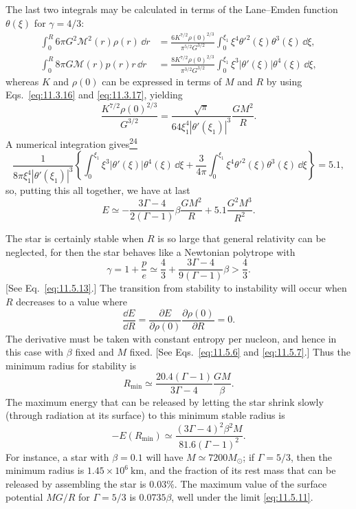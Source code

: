 The last two integrals may be calculated in terms of the Lane--Emden function
\(\theta(\xi)\) for \(\gamma=4/3\):
\[
  \begin{aligned}
  \int_0^R6\pi G^2\mathcal{M}^2(r)\rho(r)\,\dd r
  &=
  \frac{6K^{7/2}\rho(0)^{2/3}}{\pi^{5/2}G^{3/2}}
  \int_0^{\xi_1}\xi^4\theta'^2(\xi)\theta^3(\xi)\,\dd\xi,\\
  \int_0^R8\pi G\mathcal{M}(r)p(r)r\,\dd r
  &=
  \frac{8K^{7/2}\rho(0)^{2/3}}{\pi^{3/2}G^{3/2}}
  \int_0^{\xi_1}\xi^3|\theta'(\xi)|\theta^4(\xi)\,\dd\xi,
  \end{aligned}
\]
whereas \(K\) and \(\rho(0)\) can be expressed in terms of \(M\) and \(R\)
by using Eqs.~\eqref{eq:11.3.16} and \eqref{eq:11.3.17}, yielding
\[
  \frac{K^{7/2}\rho(0)^{2/3}}{G^{3/2}}
  =
  \frac{\sqrt\pi}{64\xi_1^4|\theta'(\xi_1)|^3}
  \frac{GM^2}{R}.
\]
A numerical integration
gives\hyperref[ch11-ref-24]{\textsuperscript{24}}
\[
  \frac1{8\pi\xi_1^4|\theta'(\xi_1)|^3}
  \left\{
    \int_0^{\xi_1}\xi^3|\theta'(\xi)|\theta^4(\xi)\,\dd\xi
    +\frac3{4\pi}
    \int_0^{\xi_1}\xi^4\theta'^2(\xi)\theta^3(\xi)\,\dd\xi
  \right\}
  =
  5.1,
\]
so, putting this all together, we have at last
\begin{equation}
  E
  \simeq
  -\frac{3\Gamma-4}{2(\Gamma-1)}
  \beta\frac{GM^2}{R}
  +5.1\frac{G^2M^3}{R^2}.
  \tag{11.5.16}\label{eq:11.5.16}
\end{equation}

The star is certainly stable when \(R\) is so large that general relativity
can be neglected, for then the star behaves like a Newtonian polytrope with
\[
  \gamma
  =
  1+\frac pe
  \simeq
  \frac43+\frac{3\Gamma-4}{9(\Gamma-1)}\beta
  >
  \frac43.
\]
[See Eq.~\eqref{eq:11.5.13}.] The transition from stability to instability
will occur when \(R\) decreases to a value where
\[
  \frac{\dd E}{\dd R}
  =
  \frac{\partial E}{\partial\rho(0)}
  \frac{\partial\rho(0)}{\partial R}
  =
  0.
\]
The derivative must be taken with constant entropy per nucleon, and hence in
this case with \(\beta\) fixed and \(M\) fixed. [See
Eqs.~\eqref{eq:11.5.6} and \eqref{eq:11.5.7}.] Thus the minimum radius for
stability is
\begin{equation}
  R_{\min}
  \simeq
  \frac{20.4(\Gamma-1)}{3\Gamma-4}\frac{GM}{\beta}.
  \tag{11.5.17}\label{eq:11.5.17}
\end{equation}
The maximum energy that can be released by letting the star shrink slowly
(through radiation at its surface) to this minimum stable radius is
\begin{equation}
  -E(R_{\min})
  \simeq
  \frac{(3\Gamma-4)^2\beta^2M}{81.6(\Gamma-1)^2}.
  \tag{11.5.18}\label{eq:11.5.18}
\end{equation}
For instance, a star with \(\beta=0.1\) will have
\(M\simeq7200M_\odot\); if \(\Gamma=5/3\), then the minimum radius is
\(1.45\times10^6\ \mathrm{km}\), and the fraction of its rest mass that can
be released by assembling the star is \(0.03\%\). The maximum value of the
surface potential \(MG/R\) for \(\Gamma=5/3\) is \(0.0735\beta\), well under
the limit \eqref{eq:11.5.11}.
